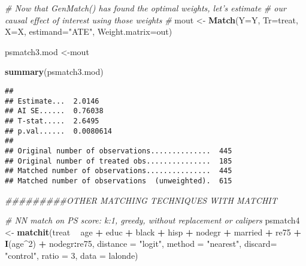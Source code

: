 \documentclass[]{article}
\newenvironment{Shaded}{\begin{snugshade}}{\end{snugshade}}
\newcommand{\CommentTok}[1]{\textcolor[rgb]{0.56,0.35,0.01}{\textit{#1}}}
\newcommand{\DataTypeTok}[1]{\textcolor[rgb]{0.13,0.29,0.53}{#1}}
\newcommand{\DecValTok}[1]{\textcolor[rgb]{0.00,0.00,0.81}{#1}}
\newcommand{\KeywordTok}[1]{\textcolor[rgb]{0.13,0.29,0.53}{\textbf{#1}}}
\newcommand{\NormalTok}[1]{#1}
\newcommand{\OperatorTok}[1]{\textcolor[rgb]{0.81,0.36,0.00}{\textbf{#1}}}
\newcommand{\StringTok}[1]{\textcolor[rgb]{0.31,0.60,0.02}{#1}}
\begin{document}
\begin{Shaded}
\begin{Highlighting}[]
\CommentTok{# Now that GenMatch() has found the optimal weights, let's estimate}
\CommentTok{# our causal effect of interest using those weights}
\CommentTok{#}
\NormalTok{mout <-}\StringTok{ }\KeywordTok{Match}\NormalTok{(}\DataTypeTok{Y=}\NormalTok{Y, }\DataTypeTok{Tr=}\NormalTok{treat, }\DataTypeTok{X=}\NormalTok{X, }\DataTypeTok{estimand=}\StringTok{"ATE"}\NormalTok{, }\DataTypeTok{Weight.matrix=}\NormalTok{out)}

\NormalTok{psmatch3.mod <-mout}

\KeywordTok{summary}\NormalTok{(psmatch3.mod)}
\end{Highlighting}
\end{Shaded}

\begin{verbatim}
## 
## Estimate...  2.0146 
## AI SE......  0.76038 
## T-stat.....  2.6495 
## p.val......  0.0080614 
## 
## Original number of observations..............  445 
## Original number of treated obs...............  185 
## Matched number of observations...............  445 
## Matched number of observations  (unweighted).  615
\end{verbatim}

\begin{Shaded}
\begin{Highlighting}[]
\CommentTok{#########OTHER MATCHING TECHNIQUES WITH MATCHIT}

\CommentTok{# NN match on PS score: k:1, greedy, without replacement or calipers}
\NormalTok{psmatch4 <-}\StringTok{ }\KeywordTok{matchit}\NormalTok{(treat }\OperatorTok{~}\StringTok{ }\NormalTok{age }\OperatorTok{+}\StringTok{ }\NormalTok{educ }\OperatorTok{+}\StringTok{ }\NormalTok{black }\OperatorTok{+}\StringTok{ }\NormalTok{hisp }\OperatorTok{+}\StringTok{ }\NormalTok{nodegr }\OperatorTok{+}\StringTok{ }\NormalTok{married }\OperatorTok{+}\StringTok{ }\NormalTok{re75}
                    \OperatorTok{+}\StringTok{ }\KeywordTok{I}\NormalTok{(age}\OperatorTok{^}\DecValTok{2}\NormalTok{) }\OperatorTok{+}\StringTok{ }\NormalTok{nodegr}\OperatorTok{:}\NormalTok{re75,  }\DataTypeTok{distance =} \StringTok{"logit"}\NormalTok{, }\DataTypeTok{method =} \StringTok{"nearest"}\NormalTok{, }\DataTypeTok{discard=} \StringTok{"control"}\NormalTok{, }
                    \DataTypeTok{ratio =} \DecValTok{3}\NormalTok{, }\DataTypeTok{data =}\NormalTok{ lalonde)}
\end{Highlighting}
\end{Shaded}
\end{document}
